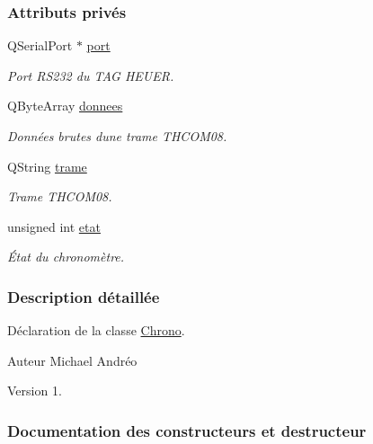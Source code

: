 \subsubsection*{Attributs privés}
\begin{DoxyCompactItemize}
\item 
Q\+Serial\+Port $\ast$ \hyperlink{class_chrono_aca5fbe0eebd7f876f954d4a99c564167}{port}
\begin{DoxyCompactList}\small\item\em Port R\+S232 du T\+AG H\+E\+U\+ER. \end{DoxyCompactList}\item 
Q\+Byte\+Array \hyperlink{class_chrono_a7771ee85460ad5f61f96cea2267ae23f}{donnees}
\begin{DoxyCompactList}\small\item\em Données brutes d\textquotesingle{}une trame T\+H\+C\+O\+M08. \end{DoxyCompactList}\item 
Q\+String \hyperlink{class_chrono_a26f2155aa6e5ef4296e5456b64a713b5}{trame}
\begin{DoxyCompactList}\small\item\em Trame T\+H\+C\+O\+M08. \end{DoxyCompactList}\item 
unsigned int \hyperlink{class_chrono_ad82d4f2a230290aa9695f12bf5ac02e8}{etat}
\begin{DoxyCompactList}\small\item\em État du chronomètre. \end{DoxyCompactList}\end{DoxyCompactItemize}


\subsubsection{Description détaillée}
Déclaration de la classe \hyperlink{class_chrono}{Chrono}. 

\begin{DoxyAuthor}{Auteur}
Michael Andréo
\end{DoxyAuthor}
\begin{DoxyVersion}{Version}
1. 
\end{DoxyVersion}


\subsubsection{Documentation des constructeurs et destructeur}
\mbox{\label{class_chrono_a01eb40847915c49c48c7dc9ca63cbd99}} 
